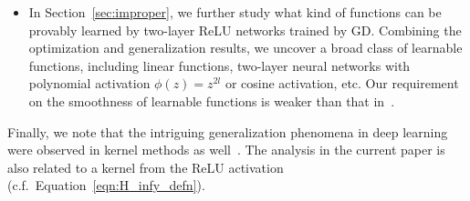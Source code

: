 \begin{itemize}
\item In Section~\ref{sec:improper}, we further study what kind of functions can be provably learned by two-layer ReLU networks trained by GD. 
Combining the optimization and generalization results, we uncover a broad class of learnable functions, including linear functions, two-layer neural networks with polynomial activation $\phi(z) = z^{2l}$ or cosine activation, etc.
Our requirement on the smoothness of learnable functions is weaker than that in~\citep{allen2018learning}.
\end{itemize}


Finally, we note that the intriguing generalization phenomena in deep learning were observed in kernel methods as well~\cite{belkin2018understand}.
The analysis in the current paper is also related to a kernel from the ReLU activation (c.f.~Equation~\eqref{eqn:H_infy_defn}).


%
%




